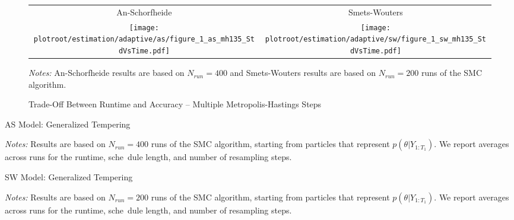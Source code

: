 \documentclass[12pt]{article}
\theoremstyle{definition}
\newcommand\plotroot{../figures_for_paper}
\begin{document}
\begin{figure}[H]
    \caption{Trade-Off Between Runtime and Accuracy -- Multiple Metropolis-Hastings Steps}
    \label{fig:smc_time_v_accuracy_mh}
    \begin{center}
        \begin{tabular}{cc}
        An-Schorfheide & Smets-Wouters \\
        \texttt{[image: \\plotroot/estimation/adaptive/as/figure\_1\_as\_mh135\_StdVsTime.pdf]} &
        \texttt{[image: \\plotroot/estimation/adaptive/sw/figure\_1\_sw\_mh135\_StdVsTime.pdf]}
        \end{tabular}
    \end{center}
    {\footnotesize {\em Notes:} An-Schorfheide results are based on $N_{run} = 400$ and Smets-Wouters results are based on $N_{run} = 200$ runs of the SMC algorithm.}\setlength{\baselineskip}{4mm}
\end{figure}

\begin{table}[H]
    \caption{AS Model: Generalized Tempering}
    \label{tab:as.smc.full.vs.datatempering}
    \begin{center}
        
    \end{center}
    {\footnotesize {\em Notes:} Results are based on $N_{run} = 400$ runs of the SMC algorithm, starting from particles that represent $p(\theta|Y_{1:T_1})$. We report averages across runs for the runtime, sche\
dule length, and number of resampling steps.}\setlength{\baselineskip}{4mm}
\end{table}

\begin{table}[H]
    \caption{SW Model: Generalized Tempering}
    \label{tab:sw.smc.full.vs.datatempering}
    \begin{center}
        
    \end{center}
    {\footnotesize {\em Notes:} Results are based on $N_{run} = 200$ runs of the SMC algorithm, starting from particles that represent $p(\theta|Y_{1:T_1})$. We report averages across runs for the runtime, sche\
dule length, and number of resampling steps.}\setlength{\baselineskip}{4mm}
\end{table}
\end{document}
